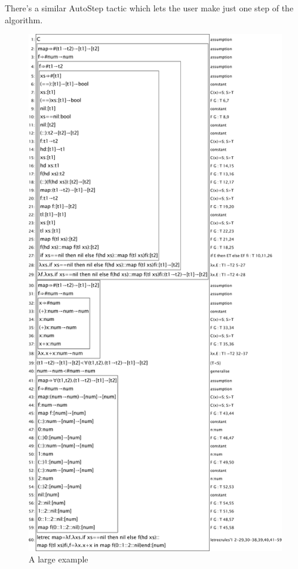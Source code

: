 There's a similar AutoStep tactic which lets the user make just one step of the algorithm.

\begin{figure}
\centering
\includegraphics[scale=0.33]{pics/HindleyMilner/maptype}
\caption{A large example}
\label{fig:HindleyMilner:maptype}
\end{figure}

